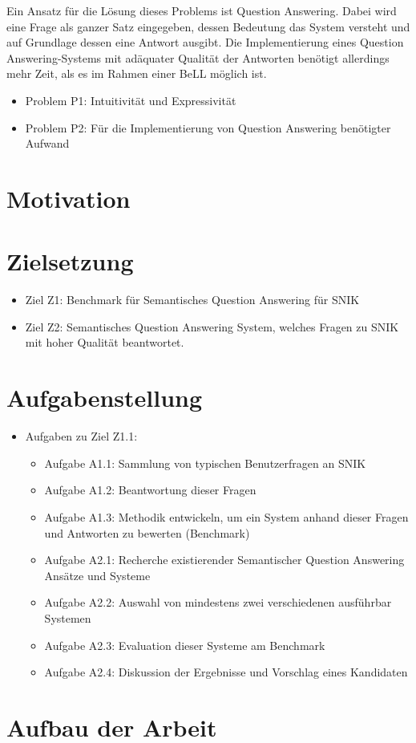 Ein Ansatz für die Lösung dieses Problems ist Question Answering.
Dabei wird eine Frage als ganzer Satz eingegeben, dessen Bedeutung das System versteht und auf Grundlage dessen eine Antwort ausgibt.
Die Implementierung eines Question Answering-Systems mit adäquater Qualität der Antworten benötigt allerdings mehr Zeit, als es im Rahmen einer BeLL möglich ist.

\begin{itemize}
\item Problem P1: Intuitivität und Expressivität
\item Problem P2: Für die Implementierung von Question Answering benötigter Aufwand
\end{itemize}


\section{Motivation}


\section{Zielsetzung}\label{sec:zielsetzung}
	\begin{itemize}
	\item Ziel Z1: Benchmark für Semantisches Question Answering für SNIK
	\item Ziel Z2: Semantisches Question Answering System, welches Fragen zu SNIK mit hoher Qualität beantwortet.
	\end{itemize}
\section{Aufgabenstellung}

\begin{itemize}
\item Aufgaben zu Ziel Z1.1:
	\begin{itemize}
	\item Aufgabe A1.1: Sammlung von typischen Benutzerfragen an SNIK
	\item Aufgabe A1.2: Beantwortung dieser Fragen
	\item Aufgabe A1.3: Methodik entwickeln, um ein System anhand dieser Fragen und Antworten zu bewerten (Benchmark)
	\item Aufgabe A2.1: Recherche existierender Semantischer Question Answering Ansätze und Systeme
	\item Aufgabe A2.2: Auswahl von mindestens zwei verschiedenen ausführbar Systemen
	\item Aufgabe A2.3: Evaluation dieser Systeme am Benchmark
	\item Aufgabe A2.4: Diskussion der Ergebnisse und Vorschlag eines Kandidaten
	\end{itemize}
\end{itemize}

\section{Aufbau der Arbeit}
